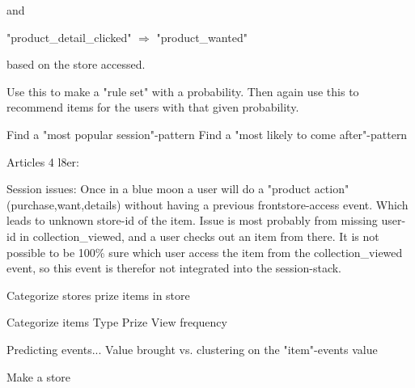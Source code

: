 and

"product\_detail\_clicked" $\Rightarrow$ "product\_wanted"

based on the store accessed.

Use this to make a "rule set" with a probability.
Then again use this to recommend items for the users with that given probability.

Find a "most popular session"-pattern
Find a "most likely to come after"-pattern


Articles 4 l8er:

Session issues:
Once in a blue moon a user will do a "product action" (purchase,want,details) without having a previous frontstore-access event. Which leads to unknown store-id of the item.
Issue is most probably from missing user-id in collection\_viewed, and a user checks out an item from there. It is not possible to be 100\% sure which user access the item from the collection\_viewed event, so this event is therefor not integrated into the session-stack.


Categorize stores
    prize
    items in store

Categorize items
    Type
    Prize
    View frequency

Predicting events...
    Value brought vs. clustering on the "item"-events value

Make a store






